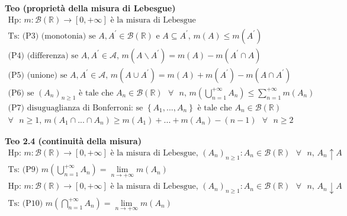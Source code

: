\documentclass{article}
\begin{document}
\textbf{Teo (propriet\`{a} della misura di Lebesgue)}%
\begin{gather*}
\text{Hp: }m:\mathcal{B}\left( 
\mathbb{R}
\right) \rightarrow \left[ 0,+\infty \right] \text{ \`{e} la misura di
Lebesgue} \\
\text{Ts: (P3) (monotonia) se }A,A^{\prime }\in \mathcal{B}\left( 
\mathbb{R}
\right) \text{ e }A\subseteq A^{\prime }\text{, }m\left( A\right) \leq
m\left( A^{\prime }\right) \\
\text{(P4) (differenza) se }A,A^{\prime }\in \mathcal{A}\text{, }m\left(
A\backslash A^{\prime }\right) =m\left( A\right) -m\left( A^{\prime }\cap
A\right) \\
\text{(P5) (unione) se }A,A^{\prime }\in \mathcal{A}\text{, }m\left( A\cup
A^{\prime }\right) =m\left( A\right) +m\left( A^{\prime }\right) -m\left(
A\cap A^{\prime }\right) \\
\text{(P6) se }\left( A_{n}\right) _{n\geq 1}\text{ \`{e} tale che }A_{n}\in 
\mathcal{B}\left( 
\mathbb{R}
\right) \text{ }\forall \text{ }n\text{, }m\left( \bigcup_{n=1}^{+\infty
}A_{n}\right) \leq \sum_{n=1}^{+\infty }m\left( A_{n}\right) \\
\text{(P7) disuguaglianza di Bonferroni: se }\left\{ A_{1},...,A_{n}\right\} 
\text{ \`{e} tale che }A_{n}\in \mathcal{B}\left( 
\mathbb{R}
\right) \\
\forall \text{ }n\geq 1\text{, }m\left( A_{1}\cap ...\cap A_{n}\right) \geq
m\left( A_{1}\right) +...+m\left( A_{n}\right) -\left( n-1\right) \text{ }%
\forall \text{ }n\geq 2
\end{gather*}

\textbf{Teo 2.4 (continuit\`{a} della misura)}
\begin{gather*}
\text{Hp}\text{: }m:\mathcal{B}\left( 
\mathbb{R}
\right) \rightarrow \left[ 0,+\infty \right] \text{ \`{e} la misura di
Lebesgue, }\left( A_{n}\right) _{n\geq 1}:A_{n}\in \mathcal{B}\left( 
\mathbb{R}
\right) \text{ }\forall \text{ }n\text{, }A_{n}\uparrow A \\
\text{Ts}\text{: (P9) }m\left( \bigcup_{n=1}^{+\infty }A_{n}\right)
=\lim_{n\rightarrow +\infty }m\left( A_{n}\right) \\
\text{Hp}\text{: }m:\mathcal{B}\left( 
\mathbb{R}
\right) \rightarrow \left[ 0,+\infty \right] \text{ \`{e} la misura di
Lebesgue, }\left( A_{n}\right) _{n\geq 1}:A_{n}\in \mathcal{B}\left( 
\mathbb{R}
\right) \text{ }\forall \text{ }n\text{, }A_{n}\downarrow A \\
\text{Ts}\text{: (P10) }m\left( \bigcap_{n=1}^{+\infty }A_{n}\right)
=\lim_{n\rightarrow +\infty }m\left( A_{n}\right)
\end{gather*}
\end{document}
